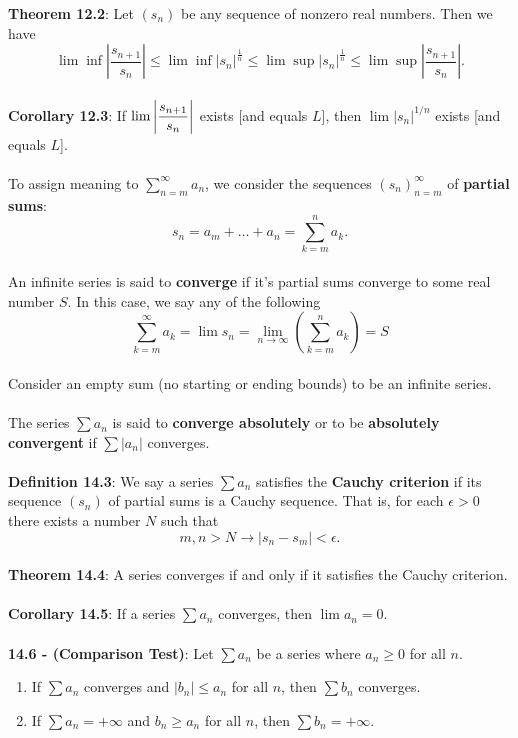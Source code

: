\documentclass{article}
\theoremstyle{definition}
\DeclareMathOperator{\Inf}{inf}
\DeclareMathOperator{\Sup}{sup}
\begin{document}
\textbf{Theorem 12.2}: Let $(s_n)$ be any sequence of nonzero real numbers. Then we have $$\lim \Inf \left|\frac{s_{n + 1}}{s_n} \right| \leq \lim \Inf \left|s_n \right|^{\frac{1}{n}} \leq \lim \Sup \left|s_n \right|^{\frac{1}{n}} \leq \lim \Sup \left|\frac{s_{n + 1}}{s_n}\right|.$$ \\
\textbf{Corollary 12.3}: If $\mathlarger{\lim \left|\frac{s_{n+1}}{s_n}\right|}$ exists [and equals $L$], then $\lim |s_n|^{1/n}$ exists [and equals $L$]. \\ \\
To assign meaning to $\sum_{n = m}^\infty a_n$, we consider the sequences $(s_n)_{n = m}^\infty$ of \textbf{partial sums}: $$s_n = a_m + \dots + a_n = \sum_{k = m}^n a_k.$$ \\
An infinite series is said to \textbf{converge} if it's partial sums converge to some real number $S$. In this case, we say any of the following $$\sum_{k = m}^\infty a_k = \lim s_n = \lim_{n \rightarrow \infty} (\sum_{k = m}^n a_k) = S$$ \\
Consider an empty sum (no starting or ending bounds) to be an infinite series. \\ \\
The series $\sum a_n$ is said to \textbf{converge absolutely} or to be \textbf{absolutely convergent} if $\sum |a_n|$ converges. \\ \\
\textbf{Definition 14.3}: We say a series $\sum a_n$ satisfies the \textbf{Cauchy criterion} if its sequence $(s_n)$ of partial sums is a Cauchy sequence. That is, for each $\epsilon > 0$ there exists a number $N$ such that $$m, n > N \rightarrow |s_n - s_m| < \epsilon.$$ \\
\textbf{Theorem 14.4}: A series converges if and only if it satisfies the Cauchy criterion. \\ \\
\textbf{Corollary 14.5}: If a series $\sum a_n$ converges, then $\lim a_n = 0$. \\ \\
\textbf{14.6 - (Comparison Test)}: Let $\sum a_n$ be a series where $a_n \geq 0$ for all $n$. \begin{enumerate}
    \item If $\sum a_n$ converges and $|b_n| \leq a_n$ for all $n$, then $\sum b_n$ converges.
    \item If $\sum a_n = +\infty$ and $b_n \geq a_n$ for all $n$, then $\sum b_n = +\infty$.
\end{enumerate} $ $ \\
\end{document}
